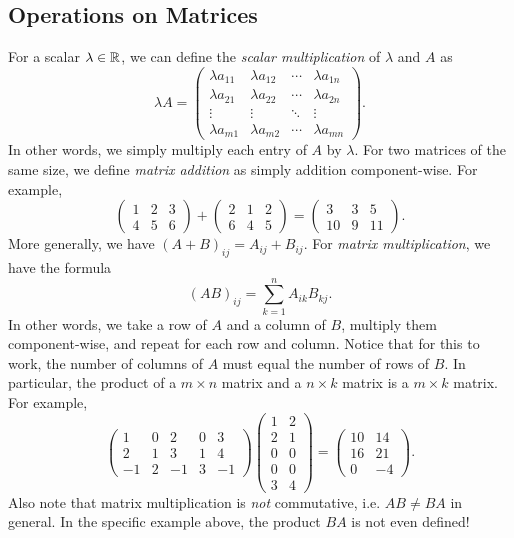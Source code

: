 \subsection{Operations on Matrices}
For a scalar $\lambda \in \mathbb{R}$, we can define the
\emph{scalar multiplication} of $\lambda$ and $A$ as
\[
  \lambda A = \begin{pmatrix}
    \lambda a_{11} & \lambda a_{12} & \cdots & \lambda a_{1n} \\
    \lambda a_{21} & \lambda a_{22} & \cdots & \lambda a_{2n} \\
    \vdots & \vdots & \ddots & \vdots \\
    \lambda a_{m 1} & \lambda a_{m 2} & \cdots & \lambda a_{m n}
  \end{pmatrix}.
\]
In other words, we simply multiply each entry of $A$
by $\lambda$. For two matrices of the same size,
we define \emph{matrix addition} as simply addition
component-wise. For example,
\[
  \begin{pmatrix}
    1 & 2 & 3 \\
    4 & 5 & 6
  \end{pmatrix} +
  \begin{pmatrix}
    2 & 1 & 2 \\
    6 & 4 & 5
  \end{pmatrix} =
  \begin{pmatrix}
    3 & 3 & 5 \\
    10 & 9 & 11
  \end{pmatrix}.
\]
More generally, we have $(A + B)_{ij} = A_{ij} + B_{ij}$.
For \emph{matrix multiplication}, we have the formula
\[
  (AB)_{ij} = \sum_{k = 1}^n A_{ik} B_{kj}.
\]
In other words, we take a row of $A$ and a column of $B$,
multiply them component-wise, and repeat for each
row and column. Notice that for this to work, the number
of columns of $A$ must equal the number of rows of $B$.
In particular, the product of a $m \times n$ matrix
and a $n \times k$ matrix is a $m \times k$ matrix.
For example,
\[
  \begin{pmatrix}
    1 & 0 & 2 & 0 & 3 \\
    2 & 1 & 3 & 1 & 4 \\
    -1 & 2 & -1 & 3 & -1
  \end{pmatrix}
  \begin{pmatrix}
    1 & 2 \\ 2 & 1 \\ 0 & 0 \\ 0 & 0 \\ 3 & 4
  \end{pmatrix} =
  \begin{pmatrix}
    10 & 14 \\ 16 & 21 \\ 0 & -4
  \end{pmatrix}.
\]
Also note that matrix multiplication is \emph{not}
commutative, i.e. $AB \neq BA$ in general. In the
specific example above, the product $BA$ is not even
defined!

